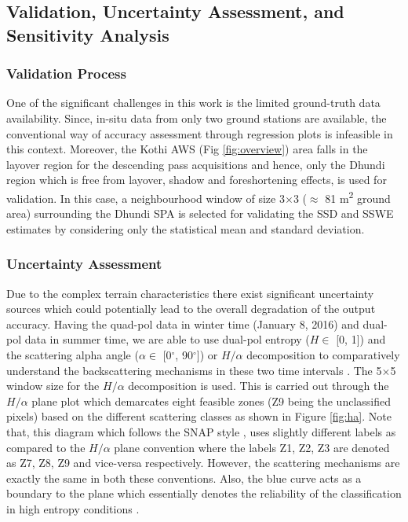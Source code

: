 \documentclass[12pt]{elsarticle}
\numberwithin{equation}{section}
\numberwithin{figure}{section}
\numberwithin{table}{section}
\begin{document}
\subsection{Validation, Uncertainty Assessment, and Sensitivity Analysis}
\label{ssec:vus}
\subsubsection{Validation Process}
\label{sssec:val}

One of the significant challenges in this work is the limited ground-truth data availability. Since, in-situ data from only two ground stations are available, the conventional way of accuracy assessment through regression plots \citep{Kugler2015, Leinss2014, Kumar2017} is infeasible in this context. Moreover, the Kothi AWS (Fig \ref{fig:overview}) area falls in the layover region for the descending pass acquisitions and hence, only the Dhundi region which is free from layover, shadow and foreshortening effects, is used for validation. In this case, a neighbourhood window of size 3$\times$3 ($\approx$ 81 m\textsuperscript{2} ground area) surrounding the Dhundi SPA is selected for validating the SSD and SSWE estimates by considering only the statistical mean and standard deviation.

\subsubsection{Uncertainty Assessment}
\label{sssec:ua}

Due to the complex terrain characteristics there exist significant uncertainty sources which could potentially lead to the overall degradation of the output accuracy. Having the quad-pol data in winter time (January 8, 2016) and dual-pol data in summer time, we are able to use dual-pol entropy ($H \in$ [0, 1]) and the scattering alpha angle ($\alpha \in$ [0$^\circ$, 90$^\circ$]) or $H/{\alpha}$ decomposition to comparatively understand the backscattering mechanisms in these two time intervals \citep{Cloude2010, Lee2009, Singh2014}. The 5$\times$5 window size for the $H/{\alpha}$ decomposition is used. This is carried out through the $H/{\alpha}$ plane plot which demarcates eight feasible zones (Z9 being the unclassified pixels) based on the different scattering classes as shown in Figure \ref{fig:ha}. Note that, this diagram which follows the SNAP style \citep{ESA2019}, uses slightly different labels as compared to the \cite{Lee2009} $H/{\alpha}$ plane convention where the labels Z1, Z2, Z3 are denoted as Z7, Z8, Z9 and vice-versa respectively. However, the scattering mechanisms are exactly the same in both these conventions. Also, the blue curve acts as a boundary to the plane which essentially denotes the reliability of the classification in high entropy conditions \citep{Brunner2009}.
\end{document}
